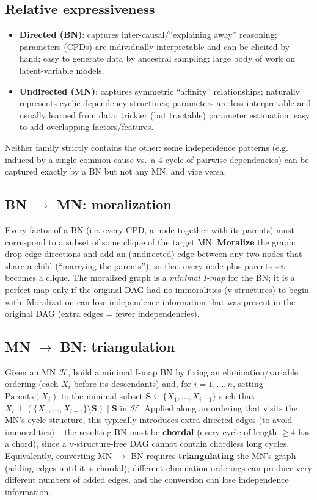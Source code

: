 \documentclass[11pt]{article}
\begin{document}
\subsection{Relative expressiveness}

\begin{itemize}
  \item \textbf{Directed (BN)}: captures inter-causal/``explaining away''
    reasoning; parameters (CPDs) are individually interpretable and can be
    elicited by hand; easy to generate data by ancestral sampling; large
    body of work on latent-variable models.
  \item \textbf{Undirected (MN)}: captures symmetric ``affinity''
    relationships; naturally represents cyclic dependency structures;
    parameters are less interpretable and usually learned from data;
    trickier (but tractable) parameter estimation; easy to add overlapping
    factors/features.
\end{itemize}

Neither family strictly contains the other: some independence patterns
(e.g. induced by a single common cause vs.\ a 4-cycle of pairwise
dependencies) can be captured exactly by a BN but not any MN, and vice
versa.

\subsection{BN $\to$ MN: moralization}

Every factor of a BN (i.e. every CPD, a node together with its parents)
must correspond to a subset of some clique of the target MN. \textbf{Moralize}
the graph: drop edge directions and add an (undirected) edge between any two
nodes that share a child (``marrying the parents''), so that every
node-plus-parents set becomes a clique. The moralized graph is a
\emph{minimal I-map} for the BN; it is a perfect map only if the original
DAG had no immoralities (v-structures) to begin with. Moralization can lose
independence information that was present in the original DAG (extra edges
= fewer independencies).

\subsection{MN $\to$ BN: triangulation}

Given an MN $\mathcal{H}$, build a minimal I-map BN by fixing an
elimination/variable ordering (each $X_i$ before its descendants) and, for
$i=1,\dots,n$, setting $\mathrm{Parents}(X_i)$ to the minimal subset
$\mathbf{S}\subseteq\{X_1,\dots,X_{i-1}\}$ such that $X_i \perp
(\{X_1,\dots,X_{i-1}\}\setminus\mathbf{S}) \mid \mathbf{S}$ in
$\mathcal{H}$. Applied along an ordering that visits the MN's cycle
structure, this typically introduces extra directed edges (to avoid
immoralities) -- the resulting BN must be \textbf{chordal} (every cycle of
length $\ge 4$ has a chord), since a v-structure-free DAG cannot contain
chordless long cycles. Equivalently, converting MN $\to$ BN requires
\textbf{triangulating} the MN's graph (adding edges until it is chordal);
different elimination orderings can produce very different numbers of
added edges, and the conversion can lose independence information.
\end{document}

